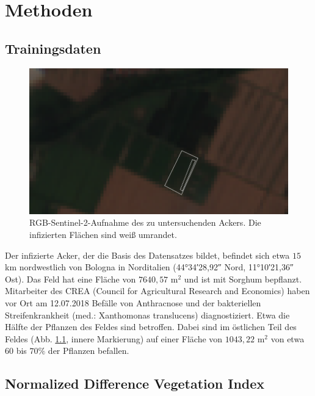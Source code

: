 \chapter{Methoden}\label{chap:methods}

\section{Trainingsdaten}\label{sec:data}
\begin{figure}[ht]
  \centering
  \includegraphics[width=.7\textwidth]{pics/roi.png}
  \caption[Region of Interest]{RGB-Sentinel-2-Aufnahme des zu untersuchenden Ackers. Die infizierten Flächen sind weiß umrandet. }
  \label{fig:roi}
\end{figure}
Der infizierte Acker, der die Basis des Datensatzes bildet, befindet sich etwa $15$ km nordwestlich von Bologna in Norditalien (\ang{44;34;28,92} Nord, \ang{11;10;21,36} Ost). Das Feld hat eine Fläche von $7640,57$ m$^2$ und ist mit Sorghum bepflanzt. Mitarbeiter des CREA (Council for Agricultural Research and Economics) haben vor Ort am 12.07.2018 Befälle von Anthracnose und der bakteriellen Streifenkrankheit (med.: Xanthomonas translucens) diagnostiziert. Etwa die Hälfte der Pflanzen des Feldes sind betroffen. Dabei sind im östlichen Teil des Feldes (Abb. \ref{fig:roi}, innere Markierung) auf einer Fläche von $1043,22$ m$^2$ von etwa $60$ bis $70\%$ der Pflanzen befallen.

\section{Normalized Difference Vegetation Index}\label{sec:ndvi}

